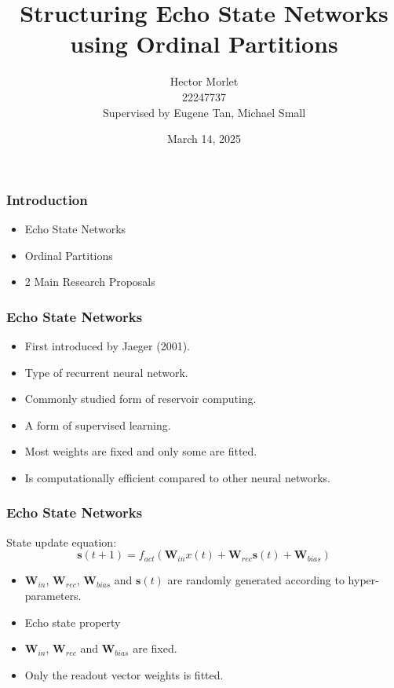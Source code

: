 \documentclass{beamer}
\title{Structuring Echo State Networks using Ordinal Partitions}%
\author{Hector Morlet\\22247737\\Supervised by Eugene Tan, Michael Small}
\date{March 14, 2025}
\begin{document}
\frame{\titlepage} %

\begin{frame}
    \frametitle{Introduction}
    \begin{itemize}
        \item Echo State Networks
        \item Ordinal Partitions
        \item 2 Main Research Proposals
    \end{itemize}
\end{frame}

\begin{frame}
    \frametitle{Echo State Networks}
    \begin{itemize}
        \item First introduced by Jaeger (2001). %
        \item Type of recurrent neural network.
        \item Commonly studied form of reservoir computing.
        \item A form of supervised learning.
        \item Most weights are fixed and only some are fitted.
        \item Is computationally efficient compared to other neural networks.
    \end{itemize}
\end{frame}

\begin{frame}
    \frametitle{Echo State Networks}
    State update equation:
    \[
        \mathbf{s}(t + 1) = f_{act}(\mathbf{W}_{in}x(t) + \mathbf{W}_{rec}\mathbf{s}(t) + \mathbf{W}_{bias})
    \]
    \begin{itemize}
        \item $\mathbf{W}_{in}$, $\mathbf{W}_{rec}$, $\mathbf{W}_{bias}$ and $\mathbf{s}(t)$ are randomly generated according to hyper-parameters.
        \item Echo state property
        \item $\mathbf{W}_{in}$, $\mathbf{W}_{rec}$ and $\mathbf{W}_{bias}$ are fixed.
        \item Only the readout vector weights is fitted. %
    \end{itemize}
\end{frame}
\end{document}
